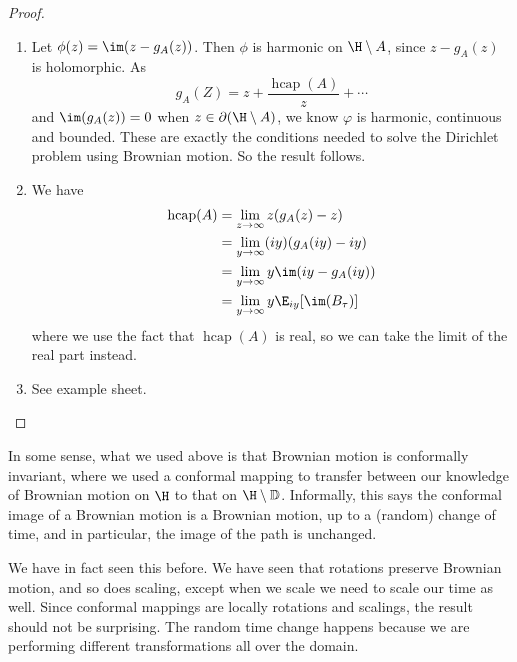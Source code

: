 \documentclass[a4paper]{article}
\renewcommand\D{\mathbb{D}}
\DeclareMathOperator\hcap{hcap}
\begin{document}
\begin{proof}\leavevmode
  \begin{enumerate}
    \item Let $\phi(z) = \im(z - g_A(z))$. Then $\phi$ is harmonic on $\H \setminus A$, since $z - g_A(z)$ is holomorphic. As
      \[
        g_A(Z) = z + \frac{\hcap (A)}{z} + \cdots
      \]
      and $\im(g_A(z)) = 0$ when $z \in \partial(\H \setminus A)$, we know $\varphi$ is harmonic, continuous and bounded. These are exactly the conditions needed to solve the Dirichlet problem using Brownian motion. So the result follows.

    \item We have
      \begin{align*}
        \hcap(A) &= \lim_{z \to \infty} z (g_A(z) - z) \\
        &= \lim_{y \to \infty} (iy) (g_A(iy) - iy)\\
        &= \lim_{y \to \infty} y \im (iy - g_A(iy))\\
        &= \lim_{y \to \infty} y \E_{iy} [\im(B_\tau)]
      \end{align*}
      where we use the fact that $\hcap(A)$ is real, so we can take the limit of the real part instead.
    \item See example sheet.\qedhere
  \end{enumerate}
\end{proof}

In some sense, what we used above is that Brownian motion is conformally invariant, where we used a conformal mapping to transfer between our knowledge of Brownian motion on $\H$ to that on $\H \setminus \D$. Informally, this says the conformal image of a Brownian motion is a Brownian motion, up to a (random) change of time, and in particular, the image of the path is unchanged.

We have in fact seen this before. We have seen that rotations preserve Brownian motion, and so does scaling, except when we scale we need to scale our time as well. Since conformal mappings are locally rotations and scalings, the result should not be surprising. The random time change happens because we are performing different transformations all over the domain.
\end{document}
